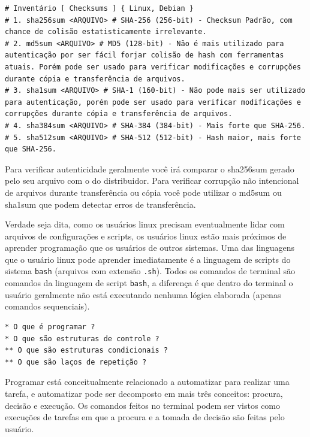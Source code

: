 \documentclass[12pt,a4paper]{article}
\begin{document}
\begin{lstlisting}
# Inventário [ Checksums ] { Linux, Debian }
# 1. sha256sum <ARQUIVO> # SHA-256 (256-bit) - Checksum Padrão, com chance de colisão estatisticamente irrelevante. 
# 2. md5sum <ARQUIVO> # MD5 (128-bit) - Não é mais utilizado para autenticação por ser fácil forjar colisão de hash com ferramentas atuais. Porém pode ser usado para verificar modificações e corrupções durante cópia e transferência de arquivos. 
# 3. sha1sum <ARQUIVO> # SHA-1 (160-bit) - Não pode mais ser utilizado para autenticação, porém pode ser usado para verificar modificações e corrupções durante cópia e transferência de arquivos.
# 4. sha384sum <ARQUIVO> # SHA-384 (384-bit) - Mais forte que SHA-256.
# 5. sha512sum <ARQUIVO> # SHA-512 (512-bit) - Hash maior, mais forte que SHA-256.
\end{lstlisting}

\vspace{\baselineskip}

Para verificar autenticidade geralmente você irá comparar o sha256sum gerado pelo seu arquivo com o do distribuidor. Para verificar corrupção não intencional de arquivos durante transferência ou cópia você pode utilizar o md5sum ou sha1sum que podem detectar erros de transferência. \\    

\hspace{\baselineskip}

Verdade seja dita, como os usuários linux precisam eventualmente lidar com arquivos de configurações e scripts, os usuários linux estão mais próximos de aprender programação que os usuários de outros sistemas. Uma das linguagens que o usuário linux pode aprender imediatamente é a linguagem de scripts do sistema \texttt{bash} (arquivos com extensão \texttt{.sh}). Todos os comandos de terminal são comandos da linguagem de script \texttt{bash}, a diferença é que dentro do terminal o usuário geralmente não está executando nenhuma lógica elaborada (apenas comandos sequenciais). \\

\begin{lstlisting}
* O que é programar ? 
* O que são estruturas de controle ?
** O que são estruturas condicionais ?
** O que são laços de repetição ?
\end{lstlisting}

\vspace{\baselineskip}

Programar está conceitualmente relacionado a automatizar para realizar uma tarefa, e automatizar pode ser decomposto em mais três conceitos: procura, decisão e execução. Os comandos feitos no terminal podem ser vistos como execuções de tarefas em que a procura e a tomada de decisão são feitas pelo usuário.\\
\end{document}
